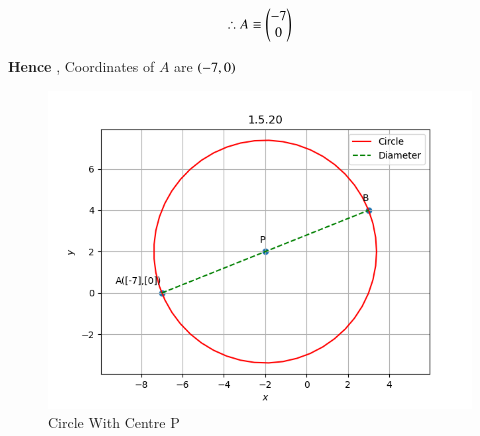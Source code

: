 \documentclass[journal]{IEEEtran}
\numberwithin{equation}{enumi}
\numberwithin{figure}{enumi}
\begin{document}
\begin{align*}
        \therefore A \equiv \begin{pmatrix}-7\\0\end{pmatrix}
\end{align*}

\textbf{Hence} , Coordinates of $A$ are $\left(-7,0\right)$ 

\begin{figure}[H]
    \centering
    \includegraphics[width=1\linewidth]{figs/circle_graph2.png}
    \caption*{Circle With Centre P}
    \label{fig:placeholder_1}
\end{figure}
\end{document}
